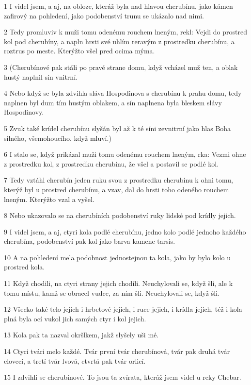 \par 1 I videl jsem, a aj, na obloze, kteráž byla nad hlavou cherubínu, jako kámen zafirový na pohledení, jako podobenství trunu se ukázalo nad nimi.
\par 2 Tedy promluviv k muži tomu odenému rouchem lneným, rekl: Vejdi do prostred kol pod cherubíny, a napln hrsti své uhlím reravým z prostredku cherubínu, a roztrus po meste. Kterýžto všel pred ocima mýma.
\par 3 (Cherubínové pak stáli po pravé strane domu, když vcházel muž ten, a oblak hustý naplnil sín vnitrní.
\par 4 Nebo když se byla zdvihla sláva Hospodinova s cherubínu k prahu domu, tedy naplnen byl dum tím hustým oblakem, a sín naplnena byla bleskem slávy Hospodinovy.
\par 5 Zvuk také krídel cherubínu slyšán byl až k té síni zevnitrní jako hlas Boha silného, všemohoucího, když mluví.)
\par 6 I stalo se, když prikázal muži tomu odenému rouchem lneným, rka: Vezmi ohne z prostredku kol, z prostredku cherubínu, že všel a postavil se podlé kol.
\par 7 Tedy vztáhl cherubín jeden ruku svou z prostredku cherubínu k ohni tomu, kterýž byl u prostred cherubínu, a vzav, dal do hrsti toho odeného rouchem lneným. Kterýžto vzal a vyšel.
\par 8 Nebo ukazovalo se na cherubíních podobenství ruky lidské pod krídly jejich.
\par 9 I videl jsem, a aj, ctyri kola podlé cherubínu, jedno kolo podlé jednoho každého cherubína, podobenství pak kol jako barva kamene tarsis.
\par 10 A na pohledení mela podobnost jednostejnou ta kola, jako by bylo kolo u prostred kola.
\par 11 Když chodili, na ctyri strany jejich chodili. Neuchylovali se, když šli, ale k tomu místu, kamž se obracel vudce, za ním šli. Neuchylovali se, když šli.
\par 12 Všecko také telo jejich i hrbetové jejich, i ruce jejich, i krídla jejich, též i kola plná byla ocí vukol jich samých ctyr i kol jejich.
\par 13 Kola pak ta nazval okršlkem, jakž slyšely uši mé.
\par 14 Ctyri tvári melo každé. Tvár první tvár cherubínová, tvár pak druhá tvár clovecí, a tretí tvár lvová, ctvrtá pak tvár orlicí.
\par 15 I zdvihli se cherubínové. To jsou ta zvírata, kteráž jsem videl u reky Chebar.
